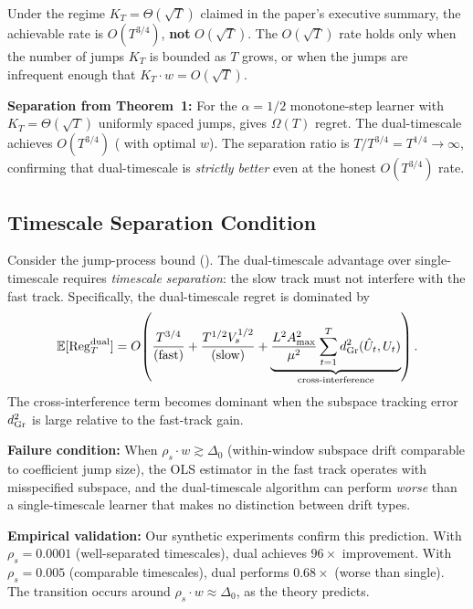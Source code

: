 \begin{remark}
\label{rem:honest-rate}
Under the regime $K_T = \Theta(\sqrt{T})$ claimed in the paper's
executive summary, the achievable rate is $O(T^{3/4})$, \textbf{not}
$O(\sqrt{T})$. The $O(\sqrt{T})$ rate holds only when the number of
jumps $K_T$ is bounded as $T$ grows, or when the jumps are infrequent
enough that $K_T \cdot w = O(\sqrt{T})$.

\medskip
\noindent\textbf{Separation from Theorem~1:}
For the $\alpha=1/2$ monotone-step learner with $K_T = \Theta(\sqrt{T})$
uniformly spaced jumps,  gives $\Omega(T)$
regret. The dual-timescale achieves $O(T^{3/4})$
( with optimal $w$). The separation ratio is
$T / T^{3/4} = T^{1/4} \to \infty$, confirming that dual-timescale
is \emph{strictly better} even at the honest $O(T^{3/4})$ rate.
\end{remark}

\subsection{Timescale Separation Condition}

\begin{proposition}
\label{prop:timescale-sep}
Consider the jump-process bound ().
The dual-timescale advantage over single-timescale requires
\emph{timescale separation}: the slow track must not interfere
with the fast track. Specifically, the dual-timescale regret
is dominated by
\[
  \mathbb{E}[\mathrm{Reg}_T^{\mathrm{dual}}] = O\!\left(
    \frac{T^{3/4}}{(\text{fast})} + \frac{T^{1/2}V_s^{1/2}}{(\text{slow})}
    + \underbrace{\frac{L^2A_{\max}^2}{\mu^2}
    \sum_{t=1}^T d_{\mathrm{Gr}}^2(\hat{U}_t, U_t)}_{\text{cross-interference}}
  \right).
\]
The cross-interference term becomes dominant when the subspace
tracking error $d_{\mathrm{Gr}}^2$ is large relative to the fast-track gain.

\textbf{Failure condition:} When $\rho_s \cdot w \gtrsim \Delta_0$
(within-window subspace drift comparable to coefficient jump size),
the OLS estimator in the fast track operates with misspecified subspace,
and the dual-timescale algorithm can perform \emph{worse} than
a single-timescale learner that makes no distinction between drift types.

\textbf{Empirical validation:} Our synthetic experiments confirm this
prediction. With $\rho_s = 0.0001$ (well-separated timescales),
dual achieves $96\times$ improvement. With $\rho_s = 0.005$ (comparable
timescales), dual performs $0.68\times$ (worse than single).
The transition occurs around $\rho_s \cdot w \approx \Delta_0$,
as the theory predicts.
\end{proposition}

